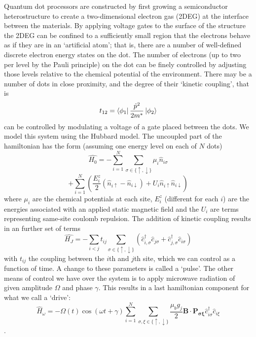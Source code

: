\documentclass{report}
\begin{document}
Quantum dot processors are constructed by first growing a semiconductor heterostructure to create a two-dimensional electron gas (2DEG) at the interface between the materials. By applying voltage gates to the surface of the structure the 2DEG can be confined to a sufficiently small region that the electrons behave as if they are in an `artificial atom'; that is, there are a number of well-defined discrete electron energy states on the dot. The number of electrons (up to two per level by the Pauli principle) on the dot can be finely controlled by adjusting those levels relative to the chemical potential of the environment. There may be a number of dots in close proximity, and the degree of their `kinetic coupling', that is
\begin{equation*}
    t_{12} = \bra{\phi_1}\frac{\hat{p}^2}{2m^*}\ket{\phi_2}
\end{equation*} can be controlled by modulating a voltage of a gate placed between the dots.
We model this system using the Hubbard model\cite{Hubbard1963}. The uncoupled part of the hamiltonian has the form (assuming one energy level on each of $N$ dots)
\begin{equation*}
    \hat{H_0} = -\sum_{i = 1}^{N}{\sum_{\sigma \in \{\uparrow, \downarrow\}}{\mu_i\hat{n}_{i\sigma}}}
\end{equation*}
\begin{equation*}
    +\sum_{i = 1}^{N}{(\frac{E_i^z}{2} (\hat{n}_{i\uparrow} - \hat{n}_{i\downarrow}) 
    + U_i \hat{n}_{i\uparrow} \hat{n}_{i\downarrow}) }
\end{equation*}
where $\mu_i$ are the chemical potentials at each site, $E^z_i$ (different for each $i$) are the energies associated with an applied static magnetic field and the $U_i$ are terms representing same-site coulomb repulsion. The addition of kinetic coupling results in an further set of terms
\begin{equation*}
    \hat{H_J} = -\sum_{i < j}t_{ij}{\sum_{\sigma \in \{\uparrow, \downarrow\}}
    (\hat{c}_{i,\sigma}^\dag \hat{c}_{j\sigma} + \hat{c}_{j,\sigma}^\dag \hat{c}_{i\sigma})}
\end{equation*} with $t_{ij}$ the coupling between the $i$th and $j$th site, which we can control as a function of time. A change to these parameters is called a `pulse'. The other means of control we have over the system is to apply microwave radiation of given amplitude $\Omega$ and phase $\gamma$. This results in a last hamiltonian component for what we call a `drive':
\begin{equation*}
    \hat{H}_\omega = -\Omega(t)\cos(\omega t + \gamma) \sum_{i = 1}^{N}\sum_{\sigma,\xi \in \{\uparrow, \downarrow\}}
    \frac{\mu_b g_j}{2}\mathbf{B}\cdot\mathbf{P_{\sigma\xi}}\hat{c}^\dag_{i\sigma}\hat{c}_{i\xi}
\end{equation*}.
\end{document}
